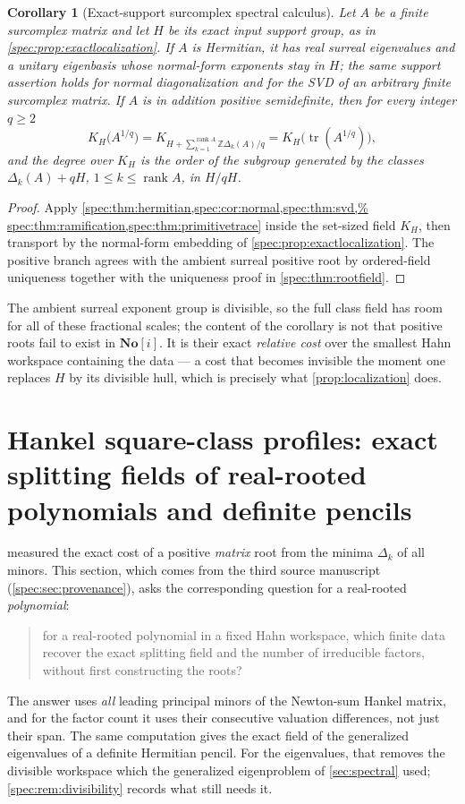 \documentclass[11pt,a4paper]{article}
\numberwithin{equation}{section}
\newtheorem{corollary}[corollary]{Corollary}
\theoremstyle{definition}
\theoremstyle{remark}
\newcommand{\SC}{\mathbf{No}[i]}
\newcommand{\Z}{\mathbb Z}
\newcommand{\rank}{\operatorname{rank}}
\newcommand{\tr}{\operatorname{tr}}
\begin{document}
\begin{corollary}[Exact-support surcomplex spectral calculus]\label{spec:cor:surcomplex}
Let $A$ be a finite surcomplex matrix and let $H$ be its exact input support
group, as in \cref{spec:prop:exactlocalization}. If $A$ is Hermitian, it has
real surreal eigenvalues and a unitary eigenbasis whose normal-form
exponents stay in $H$; the same support assertion holds for normal
diagonalization and for the SVD of an arbitrary finite surcomplex matrix.
If $A$ is in addition positive semidefinite, then for every integer $q\ge2$
\[
 K_H\bigl(A^{1/q}\bigr)
   =K_{H+\sum_{k=1}^{\rank A}\Z\Delta_k(A)/q}
   =K_H\bigl(\tr(A^{1/q})\bigr),
\]
and the degree over $K_H$ is the order of the subgroup generated by the
classes $\Delta_k(A)+qH$, $1\le k\le\rank A$, in $H/qH$.
\end{corollary}
\begin{proof}
Apply \cref{spec:thm:hermitian,spec:cor:normal,spec:thm:svd,%
spec:thm:ramification,spec:thm:primitivetrace} inside the set-sized field
$K_H$, then transport by the normal-form embedding of
\cref{spec:prop:exactlocalization}. The positive branch agrees with the
ambient surreal positive root by ordered-field uniqueness together with the
uniqueness proof in \cref{spec:thm:rootfield}.
\end{proof}

The ambient surreal exponent group is divisible, so the full class field has
room for all of these fractional scales; the content of the corollary is not
that positive roots fail to exist in $\SC$. It is their exact \emph{relative
cost} over the smallest Hahn workspace containing the data --- a cost that
becomes invisible the moment one replaces $H$ by its divisible hull, which
is precisely what \cref{prop:localization} does.

\section{Hankel square-class profiles: exact splitting fields of real-rooted polynomials and definite pencils}
\label{spec:hank:sec:profiles}

 measured the exact cost of a
positive \emph{matrix} root from the minima $\Delta_k$ of all minors. This
section, which comes from the third source manuscript
(\cref{spec:sec:provenance}), asks the corresponding question for a
real-rooted \emph{polynomial}:
\begin{quote}
for a real-rooted polynomial in a fixed Hahn workspace, which finite data
recover the exact splitting field and the number of irreducible factors,
without first constructing the roots?
\end{quote}
The answer uses \emph{all} leading principal minors of the Newton-sum Hankel
matrix, and for the factor count it uses their consecutive valuation
differences, not just their span. The same computation gives the exact field
of the generalized eigenvalues of a definite Hermitian pencil. For the
eigenvalues, that removes the divisible workspace which the generalized
eigenproblem of \cref{sec:spectral} used; \cref{spec:rem:divisibility} records
what still needs it.
\end{document}
